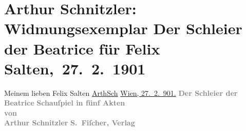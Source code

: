 

         
         \renewcommand{\erwaehntePersonen}{Personen: Felix Salten}
         \renewcommand{\erwaehnteInstitutionen}{Institutionen: S. Fischer Verlag}
         \renewcommand{\erwaehnteOrte}{Orte: Berlin, Wien}
         \renewcommand{\erwaehnteWerke}{Werke: Börsenblatt für den Deutschen Buchhandel, Der Schleier der Beatrice. Schauspiel in fünf Akten}
               \section[ Arthur Schnitzler: Widmungsexemplar Der Schleier der Beatrice für Felix Salten, 27. 2. 1901]{ Arthur Schnitzler: Widmungsexemplar Der Schleier der Beatrice für Felix
               Salten, 27. 2. 1901}\nopagebreak{}\rehead{ }\begin{ledgroupsized}[t]{13cm}\normalsize\beginnumbering \toendnotes[C]{\smallbreak\pagebreak[2]} 
\toendnotes[C]{\smallbreak}\pstart
           \noindent{}{\pb}Meinem lieben Felix Salten\pend
           \pstart \spacefill\mbox{\uline{ArthSch}}\pend{}\pstart
           \uline{Wien, 27. 2. 901.}\pend
           {\bigskip}\pstart
           \noindent{}\centering{}{\pb}\textcolor{gray}{\textbf{Der Schleier der Beatrice}}\pend
           \pstart
           \noindent{}\centering{}\textcolor{gray}{\textbf{Schauſpiel in fünf Akten}}{\\}\textcolor{gray}{\textbf{von}}{\\}\textcolor{gray}{\textbf{\textbf{Arthur Schnitzler}}}\pend
           {\bigskip}\pstart
           \noindent{}\centering{}\textcolor{gray}{\textbf{}}\pend
           \pstart
           \noindent{}\centering{}\textcolor{gray}{\textbf{S. Fiſcher, Verlag}}\pend
           \pstart
           \noindent{}\centering{}\textcolor{gray}{\textbf{\label{K_L03599-1v}\label{K_L03599-1h}}}\pend
           
         
         \endnumbering{}\end{ledgroupsized}  \newcommand{\dateiname}{L03599}\newcommand{\titel}{Arthur Schnitzler: Widmungsexemplar Der Schleier der Beatrice für Felix Salten, 27. 2. 1901}\newcommand{\editorInnen}{Martin Anton Müller und Laura Untner}
      